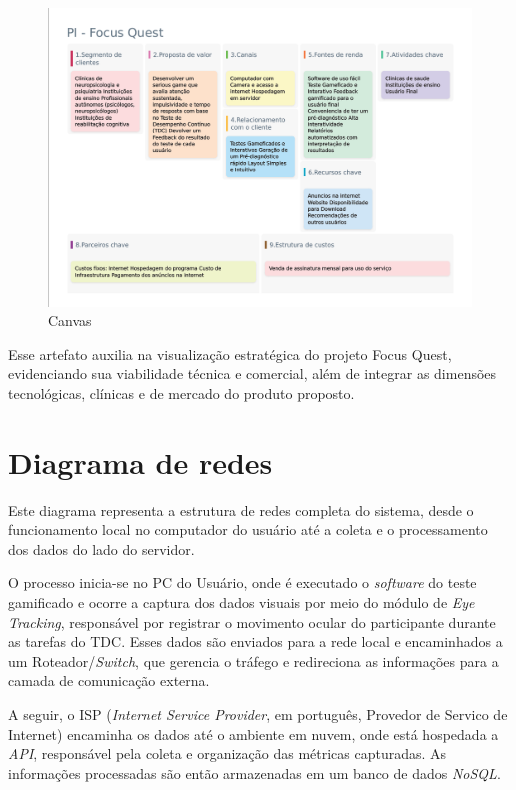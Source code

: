 \documentclass[
  a4paper,%
  12pt,%
  english,%
  brazilian,%
]{article}
\begin{document}
\begin{figure}[H]
\centering
\caption{Canvas}%
\label{fig:canvas}
\includegraphics[width=1.1\textwidth]{Logos/canvas.png}
\end{figure}

    Esse artefato auxilia na visualização estratégica do projeto Focus Quest, evidenciando sua viabilidade técnica e comercial, além de integrar as dimensões tecnológicas, clínicas e de mercado do produto proposto.

\section*{Diagrama de redes}
    
    Este diagrama representa a estrutura de redes completa do sistema, desde o funcionamento local no computador do usuário até a coleta e o processamento dos dados do lado do servidor.

    O processo inicia-se no PC do Usuário, onde é executado o \textit{software} do teste gamificado e ocorre a captura dos dados visuais por meio do módulo de \textit{Eye Tracking}, responsável por registrar o movimento ocular do participante durante as tarefas do TDC. Esses dados são enviados para a rede local e encaminhados a um Roteador/\textit{Switch}, que gerencia o tráfego e redireciona as informações para a camada de comunicação externa.

    A seguir, o ISP (\textit{Internet Service Provider}, em português, Provedor de Servico de Internet) encaminha os dados até o ambiente em nuvem, onde está hospedada a \textit{API}, responsável pela coleta e organização das métricas capturadas. As informações processadas são então armazenadas em um banco de dados \textit{NoSQL}.
\end{document}
